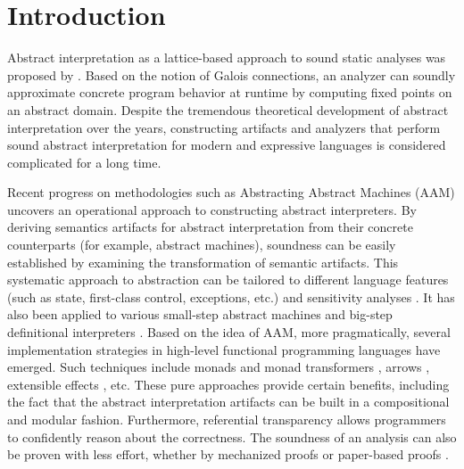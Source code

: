 \section{Introduction} \label{intro}

Abstract interpretation as a lattice-based approach to sound static analyses was
proposed by \citet{DBLP:conf/popl/CousotC77, CousotCousot79-1}. Based on the
notion of Galois connections, an analyzer can soundly approximate concrete
program behavior at runtime by computing fixed points on an abstract domain.
Despite the tremendous theoretical development of abstract interpretation over
the years, constructing artifacts and analyzers that perform sound abstract
interpretation for modern and expressive languages is considered complicated
for a long time.

Recent progress on methodologies such as Abstracting Abstract Machines (AAM)
\cite{DBLP:journals/jfp/HornM12, DBLP:conf/icfp/HornM10} uncovers an operational
approach to constructing abstract interpreters.  By deriving semantics artifacts
for abstract interpretation from their concrete counterparts (for example,
abstract machines), soundness can be easily established by examining the
transformation of semantic artifacts. This systematic approach to abstraction
can be tailored to different language features (such as state, first-class
control, exceptions, etc.) and sensitivity analyses
\cite{DBLP:conf/icfp/Gilray0M16, DBLP:conf/popl/GilrayL0MH16,
Darais:2015:GTM:2814270.2814308}. It has also been applied to various small-step
abstract machines \cite{DBLP:journals/jfp/HornM12, DBLP:conf/icfp/HornM10,
Sergey:2013:MAI:2491956.2491979} and big-step definitional interpreters
\cite{Wei:2018:RAA:3243631.3236800, DBLP:journals/pacmpl/DaraisLNH17,
Keidel:2018:CSP:3243631.3236767}.
Based on the idea of AAM, more pragmatically, several implementation strategies
in high-level functional programming languages have emerged.  Such techniques
include monads and monad transformers \cite{DBLP:journals/pacmpl/DaraisLNH17,
Sergey:2013:MAI:2491956.2491979}, arrows \cite{Keidel:2018:CSP:3243631.3236767},
extensible effects \cite{Githubsemantic},
etc. These pure approaches provide certain benefits, including the fact that the
abstract interpretation artifacts can be built in a compositional and modular
fashion. Furthermore, referential transparency allows programmers to confidently
reason about the correctness. The soundness of an
analysis can also be proven with less effort, whether by mechanized proofs
\cite{Darais:2016:CGC:2951913.2951934} or paper-based proofs
\cite{Keidel:2018:CSP:3243631.3236767}.

